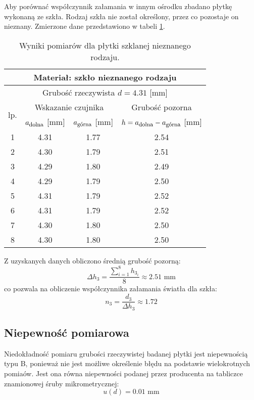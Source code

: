 \documentclass[a4paper,12pts]{article}
\begin{document}
	Aby porównać współczynnik załamania w innym ośrodku zbadano płytkę wykonaną ze szkła. Rodzaj szkła nie został określony, przez co pozostaje on nieznany. Zmierzone dane przedstawiono w tabeli \ref{szklo}.
		\begin{table}[!h]
		\centering
		\begin{tabular}{| c | c | c | c |}
			\hline
			\multicolumn{4}{|c|}{Materiał: szkło nieznanego rodzaju}  \\ \hline
			\multicolumn{4}{|c|}{Grubość rzeczywista $d = 4.31$ [mm] } \\ \hline
			\multirow{2}{*}{lp.} & \multicolumn{2}{|c|}{Wskazanie czujnika} & Grubość pozorna \\ \cline{2-4}
			& $a_{\textrm{\footnotesize dolna}}$ [mm] & $a_{\textrm{\footnotesize górna}}$ [mm] & $h = a_{\textrm{\footnotesize dolna}} - a_{\textrm{\footnotesize górna}}$ [mm] \\ \hline
			1  & 4.31 & 1.77 & 2.54 \\ \hline
			2  & 4.30 & 1.79 & 2.51 \\ \hline
			3  & 4.29 & 1.80 & 2.49 \\ \hline
			4  & 4.29 & 1.79 & 2.50 \\ \hline
			5  & 4.31 & 1.79 & 2.52 \\ \hline
			6  & 4.31 & 1.79 & 2.52 \\ \hline
			7  & 4.30 & 1.80 & 2.50 \\ \hline
			8  & 4.30 & 1.80 & 2.50 \\ \hline
		\end{tabular}
		\caption{Wyniki pomiarów dla płytki szklanej nieznanego rodzaju.}
		\label{szklo}
	\end{table}
	
	Z uzyskanych danych obliczono średnią grubość pozorną:
	\begin{equation}
		\Delta h_3 = \frac{\sum_{i = 1}^{8} h_{3_i}}{8} \approx 2.51 \textrm{ mm}
	\end{equation}
	co pozwala na obliczenie współczynnika załamania światła dla szkła:
	\begin{equation}
		n_3 = \frac{d_3}{\Delta h_3} \approx 1.72
	\end{equation}
		
	\subsection{Niepewność pomiarowa}
	Niedokładność pomiaru grubości rzeczywistej badanej płytki jest niepewnością typu B, ponieważ nie jest możliwe określenie błędu na podstawie wielokrotnych pomiaów. Jest ona równa niepewności podanej przez producenta na tabliczce znamionowej śruby mikrometrycznej:
	\begin{equation}
		u(d) = 0.01 \textrm{ mm}
	\end{equation}
	
\end{document}
